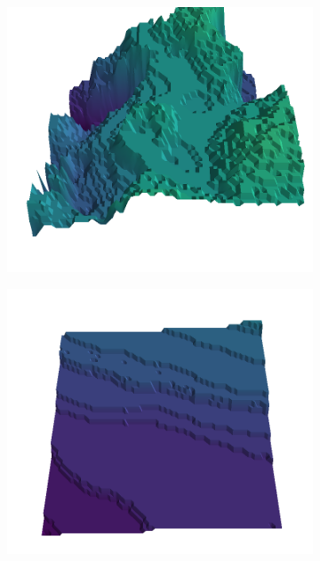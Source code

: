 \documentclass[../document.tex]{subfiles}
\begin{document}
\begin{figure}[H]
    \begin{subfigure}[b]{0.19\textwidth}
        \includegraphics[width=\linewidth]{../img/5/quarry/false_positive//patch-3d-majavi-colormap-2.png}
    \end{subfigure}
    \begin{subfigure}[b]{0.19\textwidth}
        \includegraphics[width=\linewidth]{../img/5/quarry/false_positive//patch-3d-majavi-colormap-3.png}
    \end{subfigure}  

\end{figure}
\end{document}
